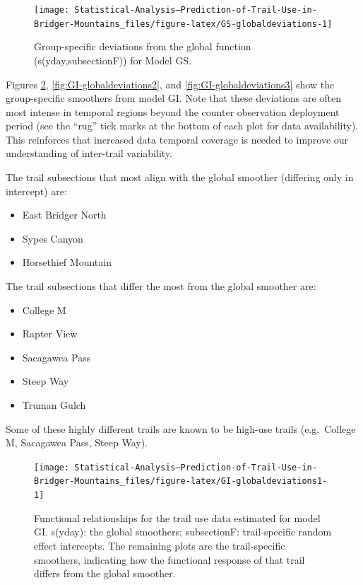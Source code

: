 \documentclass[
]{book}
\providecommand{\tightlist}{%
  \setlength{\itemsep}{0pt}\setlength{\parskip}{0pt}}
\begin{document}
\begin{figure}

{\centering \texttt{[image: Statistical-Analysis--Prediction-of-Trail-Use-in-Bridger-Mountains\_files/figure-latex/GS-globaldeviations-1]} 

}

\caption{Group-specific deviations from the global function (s(yday,subsectionF)) for Model GS.}\label{fig:GS-globaldeviations}
\end{figure}

Figures \ref{fig:GI-globaldeviations1}, \ref{fig:GI-globaldeviations2}, and \ref{fig:GI-globaldeviations3} show the group-specific smoothers from model GI. Note that these deviations are often most intense in temporal regions beyond the counter observation deployment period (see the ``rug'' tick marks at the bottom of each plot for data availability). This reinforces that increased data temporal coverage is needed to improve our understanding of inter-trail variability.

The trail subsections that most align with the global smoother (differing only in intercept) are:

\begin{itemize}
\tightlist
\item
  East Bridger North
\item
  Sypes Canyon
\item
  Horsethief Mountain
\end{itemize}

The trail subsections that differ the most from the global smoother are:

\begin{itemize}
\tightlist
\item
  College M
\item
  Rapter View
\item
  Sacagawea Pass
\item
  Steep Way
\item
  Truman Gulch
\end{itemize}

Some of these highly different trails are known to be high-use trails (e.g.~College M, Sacagawea Pass, Steep Way).

\begin{figure}

{\centering \texttt{[image: Statistical-Analysis--Prediction-of-Trail-Use-in-Bridger-Mountains\_files/figure-latex/GI-globaldeviations1-1]} 

}

\caption{Functional relationships for the trail use data estimated for model GI. s(yday): the global smoothers; subsectionF: trail-specific random effect intercepts. The remaining plots are the trail-specific smoothers, indicating how the functional response of that trail differs from the global smoother.}\label{fig:GI-globaldeviations1}
\end{figure}
\end{document}
